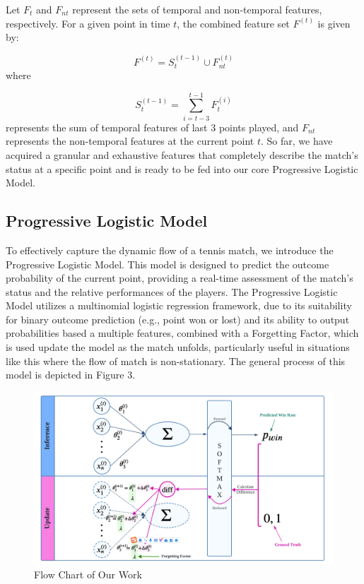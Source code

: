 \documentclass[12pt]{article}  %
\begin{document}
Let \( F_{t} \) and \( F_{nt} \) represent the sets of temporal and non-temporal features, respectively. For a given point in time \( t \), the combined feature set \( F^{(t)} \) is given by:

\[
F^{(t)} = S_{t}^{(t-1)} \cup F_{nt}^{(t)}
\]
where

\[
S_{t}^{(t-1)} = \sum_{i=t-3}^{t-1} F_{t}^{(i)}
\]
represents the sum of temporal features of last 3 points played, and \( F_{nt} \) represents the non-temporal features at the current point \( t \). So far, we have acquired a granular and exhaustive features that completely describe the match's status at a specific point and is ready to be fed into our core Progressive Logistic Model.

\subsection{Progressive Logistic Model}
To effectively capture the dynamic flow of a tennis match, we introduce the Progressive Logistic Model. This model is designed to predict the outcome probability of the current point, providing a real-time assessment of the match's status and the relative performances of the players. The Progressive Logistic Model utilizes a multinomial logistic regression framework, due to its suitability for binary outcome prediction (e.g., point won or lost) and its ability to output probabilities based a multiple features, combined with a Forgetting Factor, which is used update the model as the match unfolds, particularly useful in situations like this where the flow of match is non-stationary. The general process of this model is depicted in Figure 3. 

\begin{figure}[htbp]  %
	\centering  %
	\includegraphics[width=.9\textwidth]{logistic.png} %
	\caption{Flow Chart of Our Work} %
\end{figure}
\vspace{-0.8cm}
\end{document}
